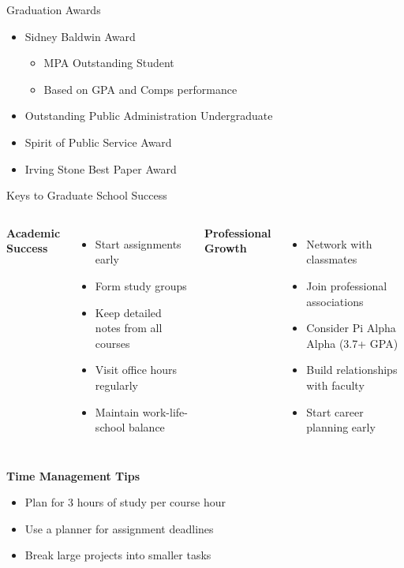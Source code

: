 \documentclass[10pt]{beamer}
\begin{document}
\begin{frame}{Graduation Awards}
\begin{itemize}
\item Sidney Baldwin Award
    \begin{itemize}
    \item MPA Outstanding Student
    \item Based on GPA and Comps performance
    \end{itemize}
\item Outstanding Public Administration Undergraduate
\item Spirit of Public Service Award
\item Irving Stone Best Paper Award
\end{itemize}
\end{frame}


\begin{frame}{Keys to Graduate School Success}
    \begin{columns}[t]
    \textbf{Academic Success}
    \begin{itemize}
    \item Start assignments early
    \item Form study groups
    \item Keep detailed notes from all courses
    \item Visit office hours regularly
    \item Maintain work-life-school balance
    \end{itemize}
    
    \textbf{Professional Growth}
    \begin{itemize}
    \item Network with classmates
    \item Join professional associations
    \item Consider Pi Alpha Alpha (3.7+ GPA)
    \item Build relationships with faculty
    \item Start career planning early
    \end{itemize}
    \end{columns}
    
    \vspace{0.5em}
    \textbf{Time Management Tips}
    \begin{itemize}
    \item Plan for 3 hours of study per course hour
    \item Use a planner for assignment deadlines
    \item Break large projects into smaller tasks
    \end{itemize}
    \end{frame}
    
\end{document}
